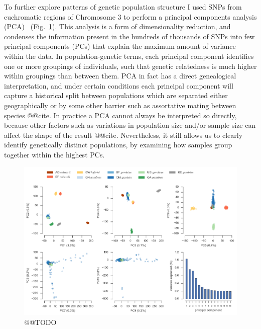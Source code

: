 \documentclass[a4paper,11pt,abstracton,hidelinks]{scrartcl}
\begin{document}
To further explore patterns of genetic population structure I used SNPs from euchromatic regions of Chromosome 3 to perform a principal components analysis (PCA)~\parencite{Patterson2006} (Fig.~\ref{fig:pca}).
%
This analysis is a form of dimensionality reduction, and condenses the information present in the hundreds of thousands of SNPs into few principal components (PCs) that explain the maximum amount of variance within the data.
%
In population-genetic terms, each principal component identifies one or more groupings of individuals, such that genetic relatedness is much higher within groupings than between them.
%
PCA in fact has a direct genealogical interpretation, and under certain conditions each principal component will capture a historical split between populations which are separated either geographically or by some other barrier such as assortative mating between species @@cite.
%
In practice a PCA cannot always be interpreted so directly, because other factors such as variations in population size and/or sample size can affect the shape of the result @@cite.
%
Nevertheless, it still allows us to clearly identify genetically distinct populations, by examining how samples group together within the highest PCs.


\begin{figure}[t!]
\centering
\includegraphics[width=\textwidth]{artwork/chapter4/pca.png}
\caption{@@TODO
%
}
\label{fig:pca}
\end{figure}
\end{document}
